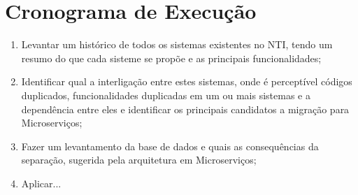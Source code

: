 \documentclass[12pt]{article}
\begin{document}
\section{Cronograma de Execução}

\begin{enumerate}
	\item Levantar um histórico de todos os sistemas existentes no NTI, tendo um resumo do que cada sisteme se propõe e as principais funcionalidades;
	\item Identificar qual a interligação entre estes sistemas, onde é perceptível códigos duplicados, funcionalidades duplicadas em um ou mais sistemas e a dependência entre eles e identificar os principais candidatos a migração para Microserviços;
	\item Fazer um levantamento da base de dados e quais as consequências da separação, sugerida pela arquitetura em Microserviços;
	\item Aplicar...
	
\end{enumerate}





\end{document}
